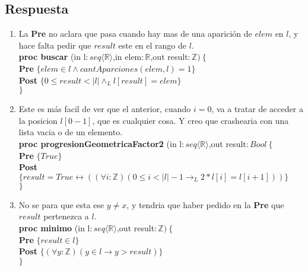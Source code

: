 \documentclass[a4paper]{article}
\begin{document}
\subsection*{Respuesta}
	\begin{enumerate}[label=\alph*)]
		\item La \textbf{Pre} no aclara que pasa cuando hay mas de una aparición de $elem$ en $l$, y hace falta pedir que $result$ este en el rango de $l$. \medskip \\
		\textbf{proc buscar }(in l$:seq\langle \mathbb{R}\rangle$,in elem$:\mathbb{R}$,out result$:\mathbb{Z})\ \{$\smallskip \\
		\hspace*{6mm} \textbf{Pre }$\{ elem \in l\wedge cantAparciones(elem,l)=1\}$\smallskip \\
		\hspace*{6mm} \textbf{Post }$\{0\leq result <|l| \wedge_L l[result]=elem\}$\\
		$\}$
		\item Este es más facil de ver que el anterior, cuando $i=0$, va a tratar de acceder a la posicion $l[0-1]$, que es cualquier cosa. Y creo que crashearia con una lista vacia o de un elemento. \medskip \\
		\textbf{proc progresionGeometricaFactor2 }(in l$:seq\langle \mathbb{R}\rangle$,out result$:Bool\ \{$\smallskip \\
		\hspace*{6mm} \textbf{Pre }$\{ True\}$\smallskip \\
		\hspace*{6mm} \textbf{Post }$\{result=True\leftrightarrow ((\forall i:\mathbb{Z})(0\leq i < |l|-1\rightarrow_L 2*l[i]=l[i+1]))\}$\\
		$\}$ 
		\item No se para que esta ese $y\neq x$, y tendria que haber pedido en la \textbf{Pre} que $result$ pertenezca a $l$.\medskip \\
		\textbf{proc minimo }(in l$:seq\langle \mathbb{R}\rangle$,out result$:\mathbb{Z})\ \{$\smallskip \\
		\hspace*{6mm} \textbf{Pre }$\{ result\in l\}$\smallskip \\
		\hspace*{6mm} \textbf{Post }$\{(\forall y:\mathbb{Z})(y\in l\rightarrow y > result)\}$\\
		$\}$
	\end{enumerate}
	
\end{document}
